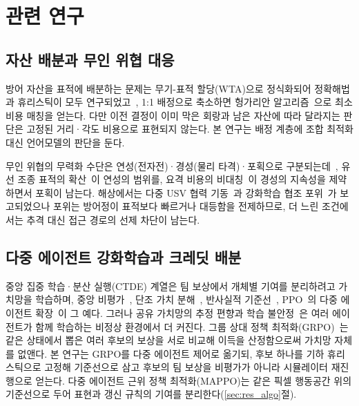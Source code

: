 \section{관련 연구}
\label{sec:related}

\subsection{자산 배분과 무인 위협 대응}

방어 자산을 표적에 배분하는 문제는 무기-표적 할당(WTA)으로 정식화되어 정확해법과
휴리스틱이 모두 연구되었고~\citep{ahuja2007wta}, 1:1 배정으로 축소하면 헝가리안
알고리즘~\citep{kuhn1955hungarian}으로 최소비용 매칭을 얻는다. 다만 이전 결정이 이미 막은
회랑과 남은 자산에 따라 달라지는 판단은 고정된 거리·각도 비용으로 표현되지 않는다. 본
연구는 배정 계층에 조합 최적화 대신 언어모델의 판단을 둔다.

무인 위협의 무력화 수단은 연성(전자전)·경성(물리 타격)·포획으로
구분되는데~\citep{wang2021cuas}, 유선 조종 표적의 확산~\citep{sutea2026fiber}이 연성의
범위를, 요격 비용의 비대칭~\citep{rumbaugh2024cost}이 경성의 지속성을 제약하면서 포획이
남는다. 해상에서는 다중 USV 협력 기동~\citep{liu2016usv}과 강화학습 협조
포위~\citep{zhang2025encircle}가 보고되었으나 포위는 방어정이 표적보다 빠르거나 대등함을
전제하므로, 더 느린 조건에서는 추격 대신 접근 경로의 선제 차단이 남는다.

\subsection{다중 에이전트 강화학습과 크레딧 배분}

중앙 집중 학습·분산 실행(CTDE) 계열은 팀 보상에서 개체별 기여를 분리하려고 가치망을
학습하며, 중앙 비평가~\citep{lowe2017maddpg}, 단조 가치 분해~\citep{rashid2018qmix},
반사실적 기준선~\citep{foerster2018coma}, PPO~\citep{schulman2017ppo}의 다중 에이전트
확장~\citep{yu2022mappo}이 그 예다. 그러나 공유 가치망의 추정 편향과 학습
불안정~\citep{haarnoja2018sac}은 여러 에이전트가 함께 학습하는 비정상 환경에서 더 커진다.
그룹 상대 정책 최적화(GRPO)~\citep{shao2024deepseekmath}는 같은 상태에서 뽑은 여러 후보의
보상을 서로 비교해 이득을 산정함으로써 가치망 자체를 없앤다. 본 연구는 GRPO를 다중 에이전트
제어로 옮기되, 후보 하나를 기하 휴리스틱으로 고정해 기준선으로 삼고 후보의 팀 보상을
비평가가 아니라 시뮬레이터 재진행으로 얻는다. 다중 에이전트 근위 정책 최적화(MAPPO)는
같은 픽셀 행동공간 위의
기준선으로 두어 표현과 갱신 규칙의 기여를 분리한다(\ref{sec:res_algo}절).

